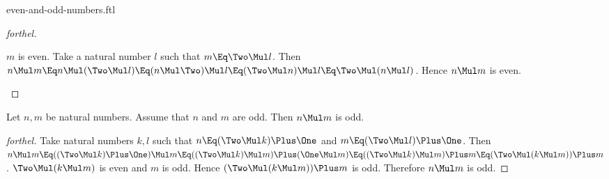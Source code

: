 \documentclass{stex}
\begin{document}
\begin{smodule}{even-and-odd-numbers.ftl}
\begin{proof}[forthel]
  \begin{case}{$m$ is even.}
    Take a natural number $l$ such that $m \Eq \Two \Mul l$.
    Then $n \Mul m
      \Eq n \Mul (\Two \Mul l)
      \Eq (n \Mul \Two) \Mul l
      \Eq (\Two \Mul n) \Mul l
      \Eq \Two \Mul (n \Mul l)$.
    Hence $n \Mul m$ is even.
  \end{case}
\end{proof}

\begin{proposition*}[forthel]
  Let $n, m$ be natural numbers.
  Assume that $n$ and $m$ are odd.
  Then $n \Mul m$ is odd.
\end{proposition*}
\begin{proof}[forthel]
  Take natural numbers $k, l$ such that $n \Eq (\Two \Mul k) \Plus  \One$ and $m \Eq (\Two \Mul l) \Plus  \One$.
  Then $n \Mul m
    \Eq ((\Two \Mul k) \Plus  \One) \Mul m
    \Eq ((\Two \Mul k) \Mul m) \Plus (\One \Mul m)
    \Eq ((\Two \Mul k) \Mul m) \Plus m
    \Eq (\Two \Mul (k \Mul m)) \Plus m$.
  $\Two \Mul (k \Mul m)$ is even and $m$ is odd.
  Hence $(\Two \Mul (k \Mul m)) \Plus m$ is odd.
  Therefore $n \Mul m$ is odd.
\end{proof}

\end{smodule}
\end{document}
